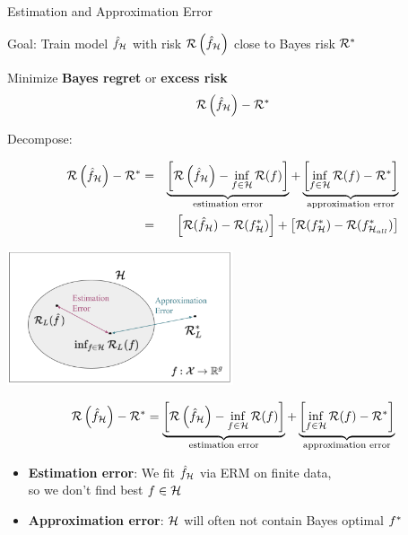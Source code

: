 \documentclass[11pt,compress,t,notes=noshow, xcolor=table]{beamer}
\begin{document}
\begin{vbframe}{Estimation and Approximation Error} 

\begin{itemizeL}
    \item Goal: Train model $\hat f_{\mathcal{H}}$ with risk $\mathcal{R}\left(\hat f_{\mathcal{H}}\right)$ close to Bayes risk $\mathcal{R}^\ast$ \\
    \item Minimize \textbf{Bayes regret} or \textbf{excess risk}
$$
	\mathcal{R}\left(\hat f_{\mathcal{H}}\right) - \mathcal{R}^\ast
$$ 

\item Decompose: 

\begin{eqnarray*}
	\mathcal{R}\left(\hat f_{\mathcal{H}}\right) - \mathcal{R}^\ast &=& \underbrace{\left[\mathcal{R}\left(\hat f_{\mathcal{H}}\right) - \inf_{f \in \mathcal{H}} \mathcal{R}(f)\right]}_{\text{estimation error}} + \underbrace{\left[\inf_{f \in \mathcal{H}} \mathcal{R}(f) - \mathcal{R}^\ast\right]}_{\text{approximation error}} \\
    &=& \left[\mathcal{R}(\hat{f}_{\mathcal{H}}) - \mathcal{R}(f^{\ast}_{\mathcal{H}})\right] + \left[\mathcal{R}(f^{\ast}_{\mathcal{H}}) - \mathcal{R}(f^{\ast}_{\mathcal{H}_{all}}) \right] 
\end{eqnarray*}

\end{itemizeL}

\framebreak 


\begin{center}
\includegraphics[width=0.5\textwidth]{figure_man/risk_minimization_diagram.png}
\end{center}



$$
	\mathcal{R}\left(\hat f_{\mathcal{H}}\right) - \mathcal{R}^\ast = \underbrace{\left[\mathcal{R}\left(\hat f_{\mathcal{H}}\right) - \inf_{f \in \mathcal{H}} \mathcal{R}(f)\right]}_{\text{estimation error}} + \underbrace{\left[\inf_{f \in \mathcal{H}} \mathcal{R}(f) - \mathcal{R}^\ast\right]}_{\text{approximation error}}  
$$

\vfill

\begin{itemize}
\item \textbf{Estimation error}:
We fit $\hat f_{\mathcal{H}}$ via ERM on finite data, \\
so we don't find best $f \in \mathcal{H}$
\item \textbf{Approximation error}: 
$\mathcal{H}$ will often not contain Bayes optimal $f^{\ast}$ 
\end{itemize}

\end{vbframe}
\end{document}

